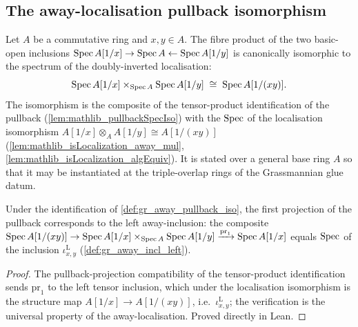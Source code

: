 \subsection*{The away-localisation pullback isomorphism}

\begin{definition}\leanok
  \label{def:gr_away_pullback_iso}
  Let \(A\) be a commutative ring and \(x, y \in A\). The fibre product of the two
  basic-open inclusions \(\operatorname{Spec} A[1/x] \to \operatorname{Spec} A \leftarrow \operatorname{Spec} A[1/y]\) is
  canonically isomorphic to the spectrum of the doubly-inverted localisation:
  \[
    \operatorname{Spec} A[1/x] \times_{\operatorname{Spec} A} \operatorname{Spec} A[1/y]
      \;\cong\; \operatorname{Spec} A[1/(xy)].
  \]
  The isomorphism is the composite of the tensor-product identification of the
  pullback (\cref{lem:mathlib_pullbackSpecIso}) with the \(\operatorname{Spec}\) of the
  localisation isomorphism
  \(A[1/x] \otimes_A A[1/y] \cong A[1/(xy)]\)
  (\cref{lem:mathlib_isLocalization_away_mul},
  \cref{lem:mathlib_isLocalization_algEquiv}). It is stated over a general base
  ring \(A\) so that it may be instantiated at the triple-overlap rings of the
  Grassmannian glue datum.
\end{definition}

\begin{lemma}\leanok
  \label{lem:gr_awayPullbackIso_inv_fst}
  Under the identification of \cref{def:gr_away_pullback_iso}, the first
  projection of the pullback corresponds to the left away-inclusion: the
  composite
  \(\operatorname{Spec} A[1/(xy)] \to \operatorname{Spec} A[1/x] \times_{\operatorname{Spec} A} \operatorname{Spec} A[1/y]
    \xrightarrow{\mathrm{pr}_1} \operatorname{Spec} A[1/x]\)
  equals \(\operatorname{Spec}\) of the inclusion \(\iota^{\mathrm{L}}_{x,y}\)
  (\cref{def:gr_away_incl_left}).
\end{lemma}
\begin{proof}
  \leanok
  The pullback-projection compatibility of the tensor-product identification
  sends \(\mathrm{pr}_1\) to the left tensor inclusion, which under the
  localisation isomorphism is the structure map \(A[1/x] \to A[1/(xy)]\), i.e.\
  \(\iota^{\mathrm{L}}_{x,y}\); the verification is the universal property of the
  away-localisation. Proved directly in Lean.
\end{proof}

